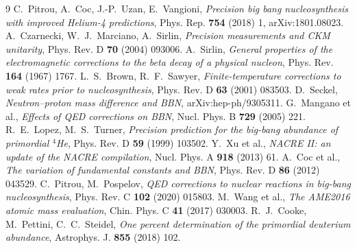 \documentclass[11pt,a4paper]{article}
\begin{document}
\begin{thebibliography}{9}
  C.~Pitrou, A.~Coc, J.-P.~Uzan, E.~Vangioni,
  \emph{Precision big bang nucleosynthesis with improved Helium-4 predictions},
  Phys. Rep. \textbf{754} (2018) 1, arXiv:1801.08023.
  A.~Czarnecki, W.~J.~Marciano, A.~Sirlin,
  \emph{Precision measurements and CKM unitarity},
  Phys. Rev. D \textbf{70} (2004) 093006.
  A.~Sirlin, \emph{General properties of the electromagnetic corrections to the
  beta decay of a physical nucleon}, Phys. Rev. \textbf{164} (1967) 1767.
  L.~S.~Brown, R.~F.~Sawyer,
  \emph{Finite-temperature corrections to weak rates prior to nucleosynthesis},
  Phys. Rev. D \textbf{63} (2001) 083503.
  D.~Seckel, \emph{Neutron--proton mass difference and BBN}, arXiv:hep-ph/9305311.
  G.~Mangano et al., \emph{Effects of QED corrections on BBN},
  Nucl. Phys. B \textbf{729} (2005) 221.
  R.~E.~Lopez, M.~S.~Turner, \emph{Precision prediction for the big-bang
  abundance of primordial $^4$He}, Phys. Rev. D \textbf{59} (1999) 103502.
  Y.~Xu et al., \emph{NACRE II: an update of the NACRE compilation},
  Nucl. Phys. A \textbf{918} (2013) 61.
  A.~Coc et al., \emph{The variation of fundamental constants and BBN},
  Phys. Rev. D \textbf{86} (2012) 043529.
  C.~Pitrou, M.~Pospelov,
  \emph{QED corrections to nuclear reactions in big-bang nucleosynthesis},
  Phys. Rev. C \textbf{102} (2020) 015803.
  M.~Wang et al., \emph{The AME2016 atomic mass evaluation},
  Chin. Phys. C \textbf{41} (2017) 030003.
  R.~J.~Cooke, M.~Pettini, C.~C.~Steidel,
  \emph{One percent determination of the primordial deuterium abundance},
  Astrophys. J. \textbf{855} (2018) 102.
\end{thebibliography}
\end{document}
